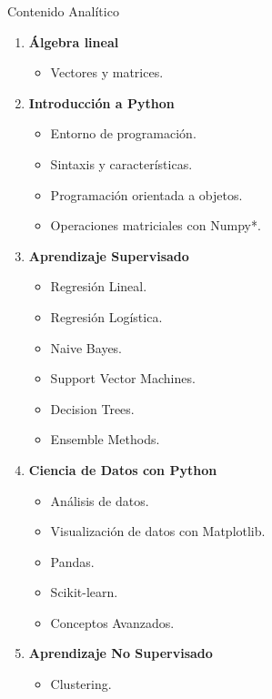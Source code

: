 \documentclass[10pt]{beamer}
\begin{document}
\begin{frame}[allowframebreaks]{Contenido Analítico}
    \begin{enumerate}
        \item \textbf{Álgebra lineal}
            \begin{itemize}
                \item Vectores y matrices.
            \end{itemize}
        \item \textbf{Introducción a Python}
            \begin{itemize}
                \item Entorno de programación.
                \item Sintaxis y características.
                \item Programación orientada a objetos.
                \item Operaciones matriciales con Numpy*.
            \end{itemize}
        \item \textbf{Aprendizaje Supervisado}
            \begin{itemize}
                \item Regresión Lineal.
                \item Regresión Logística.
                \item Naive Bayes.
                \item Support Vector Machines.
                \item Decision Trees.
                \item Ensemble Methods.
            \end{itemize}
        \item \textbf{Ciencia de Datos con Python}
            \begin{itemize}
                \item Análisis de datos.
                \item Visualización de datos con Matplotlib.
                \item Pandas.
                \item Scikit-learn.
                \item Conceptos Avanzados.
            \end{itemize}
        \item \textbf{Aprendizaje No Supervisado}
            \begin{itemize}
                \item Clustering.

\end{itemize}
\end{enumerate}
\end{frame}
\end{document}
